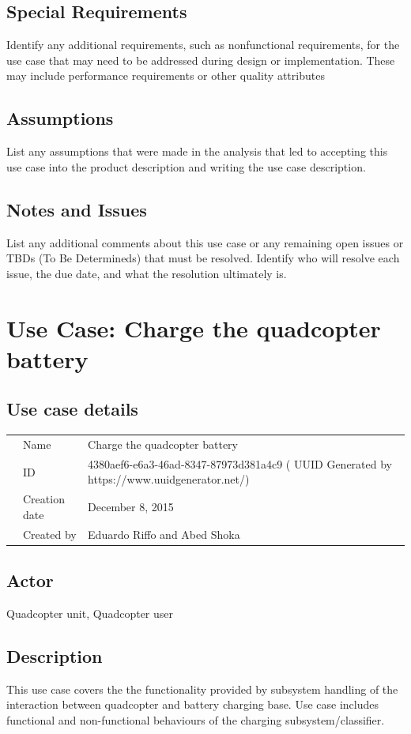 \documentclass[a4paper]{article}
\begin{document}
\subsection{Special Requirements}
Identify any additional requirements, such as nonfunctional requirements, for the use case that may need to be addressed during design or implementation. These may include performance requirements or other quality attributes
\subsection{Assumptions}
List any assumptions that were made in the analysis that led to accepting this use case into the product description and writing the use case description.
\subsection{Notes and Issues}
List any additional comments about this use case or any remaining open issues or TBDs (To Be Determineds) that must be resolved. Identify who will resolve each issue, the due date, and what the resolution ultimately is.

\newpage

\section{Use Case: Charge the quadcopter battery}
\subsection{Use case details}

\begin{tabular}{lll}
	&Name  &Charge the quadcopter battery  \\
	&ID  &4380aef6-e6a3-46ad-8347-87973d381a4c9 ( UUID Generated by https://www.uuidgenerator.net/)  \\
	&Creation date  & December 8, 2015  \\
	&Created by  &Eduardo Riffo and Abed Shoka   
\end{tabular}

\subsection{Actor}
Quadcopter unit, Quadcopter user
\subsection{Description}
This use case covers the the functionality provided by subsystem handling of the interaction between quadcopter and battery charging base. Use case includes functional and non-functional behaviours of the charging subsystem/classifier.
\end{document}
